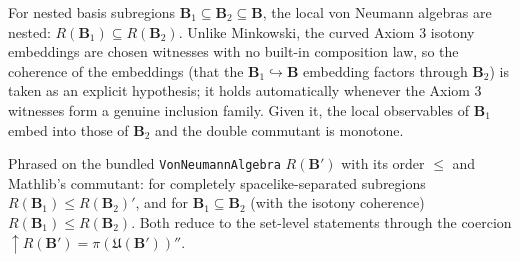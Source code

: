 \begin{theorem}
    \label{thrm:von-neumann-isotony-in-curved-spacetime}
    \leanok
    For nested basis subregions $\mathbf{B}_1 \subseteq \mathbf{B}_2 \subseteq \mathbf{B}$, the local von Neumann algebras are nested: $R(\mathbf{B}_1) \subseteq R(\mathbf{B}_2)$. Unlike Minkowski, the curved Axiom 3 isotony embeddings are chosen witnesses with no built-in composition law, so the coherence of the embeddings (that the $\mathbf{B}_1 \hookrightarrow \mathbf{B}$ embedding factors through $\mathbf{B}_2$) is taken as an explicit hypothesis; it holds automatically whenever the Axiom 3 witnesses form a genuine inclusion family. Given it, the local observables of $\mathbf{B}_1$ embed into those of $\mathbf{B}_2$ and the double commutant is monotone.
\end{theorem}

\begin{theorem}
    \label{thrm:von-neumann-bundled-order-in-curved-spacetime}
    \leanok
    Phrased on the bundled \texttt{VonNeumannAlgebra} $R(\mathbf{B}')$ with its order $\le$ and Mathlib's commutant: for completely spacelike-separated subregions $R(\mathbf{B}_1) \le R(\mathbf{B}_2)'$, and for $\mathbf{B}_1 \subseteq \mathbf{B}_2$ (with the isotony coherence) $R(\mathbf{B}_1) \le R(\mathbf{B}_2)$. Both reduce to the set-level statements through the coercion $\uparrow R(\mathbf{B}') = \pi(\mathfrak{U}(\mathbf{B}'))''$.
\end{theorem}

